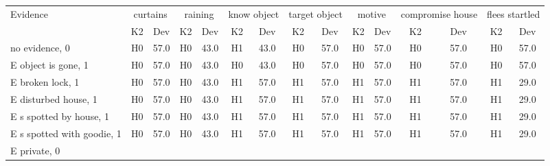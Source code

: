 \begin{table}\begin{tabular}{l|cc|cc|cc|cc|cc|cc|cc}\toprule\multirow{2}{*}{Evidence} & \multicolumn{2}{c}{curtains}& \multicolumn{2}{c}{raining}& \multicolumn{2}{c}{know object}& \multicolumn{2}{c}{target object}& \multicolumn{2}{c}{motive}& \multicolumn{2}{c}{compromise house}& \multicolumn{2}{c}{flees startled}\\& {K2} & {Dev}& {K2} & {Dev}& {K2} & {Dev}& {K2} & {Dev}& {K2} & {Dev}& {K2} & {Dev}& {K2} & {Dev}\\\midrule
no evidence, 0 & \cellcolor{Bittersweet}H0&\cellcolor{Bittersweet}57.0&\cellcolor{Bittersweet}H0&\cellcolor{Bittersweet}43.0&\cellcolor{Bittersweet}H1&\cellcolor{Bittersweet}43.0&\cellcolor{Bittersweet}H0&\cellcolor{Bittersweet}57.0&\cellcolor{Bittersweet}H0&\cellcolor{Bittersweet}57.0&\cellcolor{Bittersweet}H0&\cellcolor{Bittersweet}57.0&\cellcolor{Bittersweet}H0&\cellcolor{Bittersweet}57.0\\E object is gone, 1 & \cellcolor{Bittersweet}H0&\cellcolor{Bittersweet}57.0&\cellcolor{Bittersweet}H0&\cellcolor{Bittersweet}43.0&\cellcolor{Bittersweet}H0&\cellcolor{Bittersweet}43.0&\cellcolor{Bittersweet}H0&\cellcolor{Bittersweet}57.0&\cellcolor{Bittersweet}H0&\cellcolor{Bittersweet}57.0&\cellcolor{Bittersweet}H0&\cellcolor{Bittersweet}57.0&\cellcolor{Bittersweet}H0&\cellcolor{Bittersweet}57.0\\E broken lock, 1 & \cellcolor{Bittersweet}H0&\cellcolor{Bittersweet}57.0&\cellcolor{Bittersweet}H0&\cellcolor{Bittersweet}43.0&\cellcolor{Bittersweet}H1&\cellcolor{Bittersweet}57.0&\cellcolor{Bittersweet}H1&\cellcolor{Bittersweet}57.0&\cellcolor{Bittersweet}H1&\cellcolor{Bittersweet}57.0&\cellcolor{Bittersweet}H1&\cellcolor{Bittersweet}57.0&\cellcolor{Bittersweet}H1&\cellcolor{Bittersweet}29.0\\E disturbed house, 1 & \cellcolor{Bittersweet}H0&\cellcolor{Bittersweet}57.0&\cellcolor{Bittersweet}H0&\cellcolor{Bittersweet}43.0&\cellcolor{Bittersweet}H1&\cellcolor{Bittersweet}57.0&\cellcolor{Bittersweet}H1&\cellcolor{Bittersweet}57.0&\cellcolor{Bittersweet}H1&\cellcolor{Bittersweet}57.0&\cellcolor{Bittersweet}H1&\cellcolor{Bittersweet}57.0&\cellcolor{Bittersweet}H1&\cellcolor{Bittersweet}29.0\\E s spotted by house, 1 & \cellcolor{Bittersweet}H0&\cellcolor{Bittersweet}57.0&\cellcolor{Bittersweet}H0&\cellcolor{Bittersweet}43.0&\cellcolor{Bittersweet}H1&\cellcolor{Bittersweet}57.0&\cellcolor{Bittersweet}H1&\cellcolor{Bittersweet}57.0&\cellcolor{Bittersweet}H1&\cellcolor{Bittersweet}57.0&\cellcolor{Bittersweet}H1&\cellcolor{Bittersweet}57.0&\cellcolor{Bittersweet}H1&\cellcolor{Bittersweet}29.0\\E s spotted with goodie, 1 & \cellcolor{Bittersweet}H0&\cellcolor{Bittersweet}57.0&\cellcolor{Bittersweet}H0&\cellcolor{Bittersweet}43.0&\cellcolor{Bittersweet}H1&\cellcolor{Bittersweet}57.0&\cellcolor{Bittersweet}H1&\cellcolor{Bittersweet}57.0&\cellcolor{Bittersweet}H1&\cellcolor{Bittersweet}57.0&\cellcolor{Bittersweet}H1&\cellcolor{Bittersweet}57.0&\cellcolor{Bittersweet}H1&\cellcolor{Bittersweet}29.0\\E private, 0 & 
\end{tabular}
\end{table}
